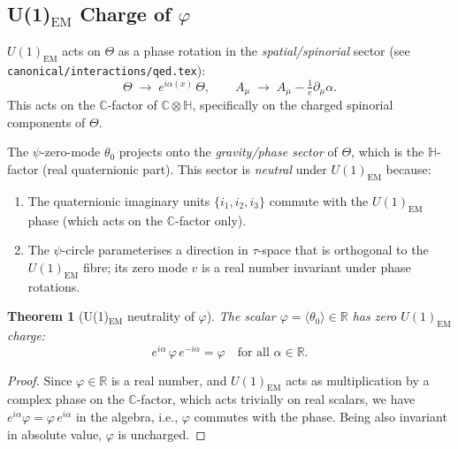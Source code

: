 \documentclass[12pt]{article}
\newtheorem{theorem}{Theorem}[section]
\theoremstyle{definition}
\theoremstyle{remark}
\begin{document}
\subsection{U(1)$_\mathrm{EM}$ Charge of $\varphi$}

$U(1)_\mathrm{EM}$ acts on $\Theta$ as a phase rotation in the \emph{spatial/spinorial}
sector (see \texttt{canonical/interactions/qed.tex}):
\begin{equation}
  \Theta \;\longrightarrow\; e^{i\alpha(x)}\,\Theta,
  \qquad A_\mu \;\longrightarrow\; A_\mu - \tfrac{1}{e}\partial_\mu\alpha.
\end{equation}
This acts on the $\mathbb{C}$-factor of $\mathbb{C}\otimes\mathbb{H}$, specifically on the
charged spinorial components of $\Theta$.

The $\psi$-zero-mode $\theta_0$ projects onto the \emph{gravity/phase sector} of $\Theta$,
which is the $\mathbb{H}$-factor (real quaternionic part).  This sector is \emph{neutral}
under $U(1)_\mathrm{EM}$ because:
\begin{enumerate}
  \item The quaternionic imaginary units $\{i_1,i_2,i_3\}$ commute with the $U(1)_\mathrm{EM}$
        phase (which acts on the $\mathbb{C}$-factor only).
  \item The $\psi$-circle parameterises a direction in $\tau$-space that is orthogonal to
        the $U(1)_\mathrm{EM}$ fibre; its zero mode $v$ is a real number invariant under
        phase rotations.
\end{enumerate}

\begin{theorem}[U(1)$_\mathrm{EM}$ neutrality of $\varphi$]
\label{thm:phi_neutral}
  The scalar $\varphi = \langle\theta_0\rangle \in \mathbb{R}$ has zero $U(1)_\mathrm{EM}$
  charge:
  \begin{equation}
    e^{i\alpha}\,\varphi\,e^{-i\alpha} = \varphi
    \quad\text{for all }\alpha\in\mathbb{R}.
  \end{equation}
\end{theorem}

\begin{proof}
  Since $\varphi\in\mathbb{R}$ is a real number, and $U(1)_\mathrm{EM}$ acts as multiplication
  by a complex phase on the $\mathbb{C}$-factor, which acts trivially on real scalars, we
  have $e^{i\alpha}\varphi = \varphi\,e^{i\alpha}$ in the algebra, i.e., $\varphi$ commutes
  with the phase.  Being also invariant in absolute value, $\varphi$ is uncharged.
\end{proof}
\end{document}
